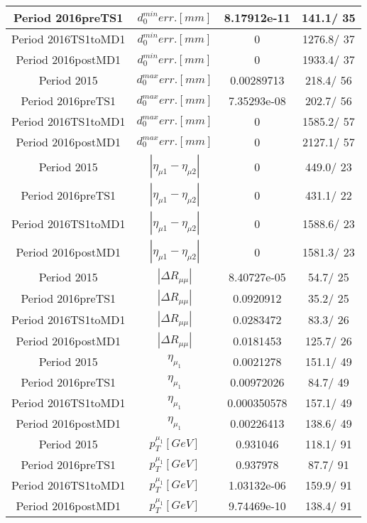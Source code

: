 \documentclass{article}
\begin{document}
\begin{longtable}{c|c|c|c}
\hline
 Period 2016preTS1 & $d_{0}^{min} err. [mm]$ & 8.17912e-11 & 141.1/ 35\\
\hline
 Period 2016TS1toMD1 & $d_{0}^{min} err. [mm]$ & 0 & 1276.8/ 37\\
\hline
 Period 2016postMD1 & $d_{0}^{min} err. [mm]$ & 0 & 1933.4/ 37\\
\hline
 Period 2015 & $d_{0}^{max} err. [mm]$ & 0.00289713 & 218.4/ 56\\
\hline
 Period 2016preTS1 & $d_{0}^{max} err. [mm]$ & 7.35293e-08 & 202.7/ 56\\
\hline
 Period 2016TS1toMD1 & $d_{0}^{max} err. [mm]$ & 0 & 1585.2/ 57\\
\hline
 Period 2016postMD1 & $d_{0}^{max} err. [mm]$ & 0 & 2127.1/ 57\\
\hline
 Period 2015 & $|\eta_{\mu1}-\eta_{\mu2}|$ & 0 & 449.0/ 23\\
\hline
 Period 2016preTS1 & $|\eta_{\mu1}-\eta_{\mu2}|$ & 0 & 431.1/ 22\\
\hline
 Period 2016TS1toMD1 & $|\eta_{\mu1}-\eta_{\mu2}|$ & 0 & 1588.6/ 23\\
\hline
 Period 2016postMD1 & $|\eta_{\mu1}-\eta_{\mu2}|$ & 0 & 1581.3/ 23\\
\hline
 Period 2015 & $|\Delta R_{\mu \mu}|$ & 8.40727e-05 &  54.7/ 25\\
\hline
 Period 2016preTS1 & $|\Delta R_{\mu \mu}|$ & 0.0920912 &  35.2/ 25\\
\hline
 Period 2016TS1toMD1 & $|\Delta R_{\mu \mu}|$ & 0.0283472 &  83.3/ 26\\
\hline
 Period 2016postMD1 & $|\Delta R_{\mu \mu}|$ & 0.0181453 & 125.7/ 26\\
\hline
 Period 2015 & $\eta_{\mu_{1}}$ & 0.0021278 & 151.1/ 49\\
\hline
 Period 2016preTS1 & $\eta_{\mu_{1}}$ & 0.00972026 &  84.7/ 49\\
\hline
 Period 2016TS1toMD1 & $\eta_{\mu_{1}}$ & 0.000350578 & 157.1/ 49\\
\hline
 Period 2016postMD1 & $\eta_{\mu_{1}}$ & 0.00226413 & 138.6/ 49\\
\hline
 Period 2015 & $p_{T}^{\mu_{1}} [GeV]$ & 0.931046 & 118.1/ 91\\
\hline
 Period 2016preTS1 & $p_{T}^{\mu_{1}} [GeV]$ & 0.937978 &  87.7/ 91\\
\hline
 Period 2016TS1toMD1 & $p_{T}^{\mu_{1}} [GeV]$ & 1.03132e-06 & 159.9/ 91\\
\hline
 Period 2016postMD1 & $p_{T}^{\mu_{1}} [GeV]$ & 9.74469e-10 & 138.4/ 91\\

\end{longtable}
\end{document}
